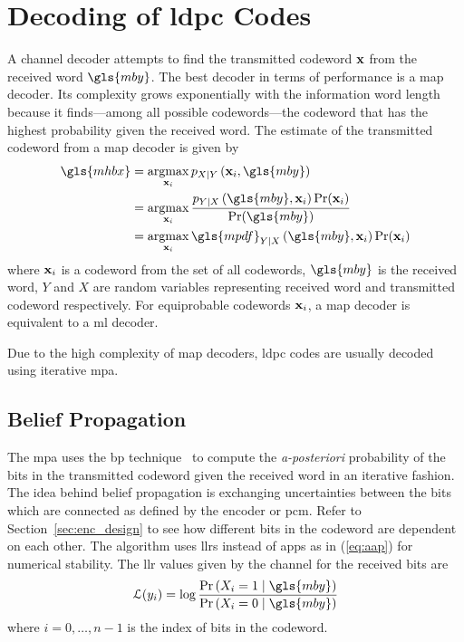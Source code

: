 \section{Decoding of \texorpdfstring{\acrlong{ldpc}}{LDPC} Codes}\label{sec:decoding_ldpc}
A channel decoder attempts to find the transmitted codeword $\mathbf{x}$ from the received word $\gls{mby}$. The best decoder in terms of performance is a \gls{map} decoder. Its complexity grows exponentially with the information word length because it finds---among all possible codewords---the codeword that has the highest probability given the received word. The estimate of the transmitted codeword from a \gls{map} decoder is given by
\begin{align}
\gls{mhbx}&=\argmax_{\x_i}\pdf_{X\mid Y}\left(\x_i,\gls{mby}\right) \nonumber\\
&=\argmax_{\x_i}\frac{\pdf_{Y\mid X}\left(\gls{mby},\x_i\right)\prob(\x_i)}{\prob(\gls{mby})} \nonumber\\
&=\argmax_{\x_i}\gls{mpdf}_{Y\mid X}\left(\gls{mby},\x_i\right)\prob(\x_i)\label{eq:aap}
\end{align}
where $\mathbf{x}_i$ is a codeword from the set of all codewords, $\gls{mby}$ is the received word, $Y$ and $X$ are random variables representing received word and transmitted codeword respectively. For equiprobable codewords $\mathbf{x}_i$, a \gls{map} decoder is equivalent to a \gls{ml} decoder.

Due to the high complexity of \gls{map} decoders, \gls{ldpc} codes are usually decoded using iterative \acrlong{mpa}.
\subsection{Belief Propagation}
The \gls{mpa} uses the \gls{bp} technique~\cite{Hagenauer1996} to compute the \emph{a-posteriori} probability of the bits in the transmitted codeword given the received word in an iterative fashion. The idea behind belief propagation is exchanging uncertainties between the bits which are connected as defined by the encoder or \gls{pcm}. Refer to Section~\ref{sec:enc_design} to see how different bits in the codeword are dependent on each other. The algorithm uses \glspl{llr} instead of \glspl{app} as in (\ref{eq:aap}) for numerical stability. The \gls{llr} values given by the channel for the received bits are
\begin{align}\mathcal{L}(y_i)=\log\frac{\prob\left(X_i=1\mid\gls{mby}\right)}{\prob\left(X_i=0\mid\gls{mby}\right)}\end{align}
where $i=0,\dots,n-1$ is the index of bits in the codeword.

